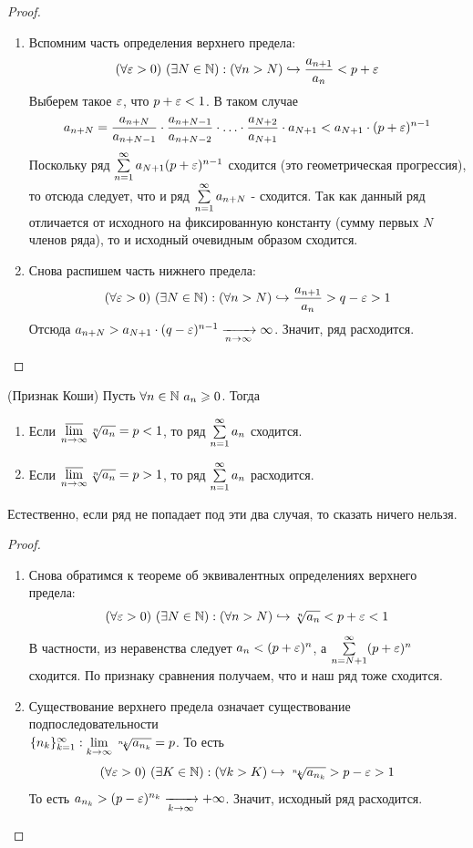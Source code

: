 \begin{proof}~
	\begin{enumerate}
		\item Вспомним часть определения верхнего предела:
		\[
			(\forall \varepsilon > 0)\ (\exists N \in \mathbb{N}) : (\forall n > N)\hookrightarrow \frac{a_{n + 1}}{a_n} < p + \varepsilon
		\]
		Выберем такое $\varepsilon$, что $p + \varepsilon < 1$. В таком случае
		\[
			a_{n + N} = \frac{a_{n + N}}{a_{n + N - 1}} \cdot \frac{a_{n + N - 1}}{a_{n + N - 2}} \cdot \ldots \cdot \frac{a_{N + 2}}{a_{N + 1}} \cdot a_{N + 1} < a_{N + 1} \cdot (p + \varepsilon)^{n - 1}
		\]
		Поскольку ряд $\sum\limits_{n = 1}^\infty a_{N + 1}(p + \varepsilon)^{n - 1}$ сходится (это геометрическая прогрессия), то отсюда следует, что и ряд $\sum\limits_{n = 1}^\infty a_{n + N}$ - сходится. Так как данный ряд отличается от исходного на фиксированную константу (сумму первых $N$ членов ряда), то и исходный очевидным образом сходится.
		
		\item Снова распишем часть нижнего предела:
		\[
			(\forall \varepsilon > 0)\ (\exists N \in \mathbb{N}) : (\forall n > N)\hookrightarrow \frac{a_{n + 1}}{a_n} > q - \varepsilon > 1
		\]
		Отсюда $a_{n + N} > a_{N + 1} \cdot (q - \varepsilon)^{n - 1} \xrightarrow[n \to \infty]{} \infty$. Значит, ряд расходится.
	\end{enumerate}
\end{proof}

\begin{theorem} (Признак Коши)
	Пусть $\forall n \in \mathbb{N}\ a_n \geqslant 0$. Тогда
	\begin{enumerate}
		\item Если $\varlimsup\limits_{n \to \infty} \sqrt[n]{a_n} = p < 1$, то ряд $\sum\limits_{n = 1}^\infty a_n$ сходится.
		
		\item Если $\varlimsup\limits_{n \to \infty} \sqrt[n]{a_n} = p > 1$, то ряд $\sum\limits_{n = 1}^\infty a_n$ расходится.
	\end{enumerate}
	Естественно, если ряд не попадает под эти два случая, то сказать ничего нельзя.
\end{theorem}

\begin{proof}~
	\begin{enumerate}
		\item Снова обратимся к теореме об эквивалентных определениях верхнего предела:
		\[
			(\forall \varepsilon > 0)\ (\exists N \in \mathbb{N}) : (\forall n > N)\hookrightarrow \sqrt[n]{a_n} < p + \varepsilon < 1
		\]
		В частности, из неравенства следует $a_n < (p + \varepsilon)^n$, а $\sum\limits_{n = N + 1}^\infty (p + \varepsilon)^n$ сходится. По признаку сравнения получаем, что и наш ряд тоже сходится.
		
		\item Существование верхнего предела означает существование подпоследовательности \\ $\{n_k\}_{k = 1}^\infty : \lim\limits_{k \to \infty} \sqrt[n_k]{a_{n_k}} = p$. То есть
		\[
			(\forall \varepsilon > 0)\ (\exists K \in \mathbb{N}) : (\forall k > K)\hookrightarrow \sqrt[n_k]{a_{n_k}} > p - \varepsilon > 1
		\]
		То есть $a_{n_k} > (p - \varepsilon)^{n_k} \xrightarrow[k \to \infty]{} +\infty$. Значит, исходный ряд расходится.
	\end{enumerate}
\end{proof}


